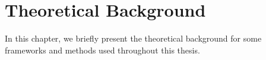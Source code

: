 \chapter{Theoretical Background}
In this chapter, we briefly present the theoretical background for some frameworks and methods used throughout this thesis.


